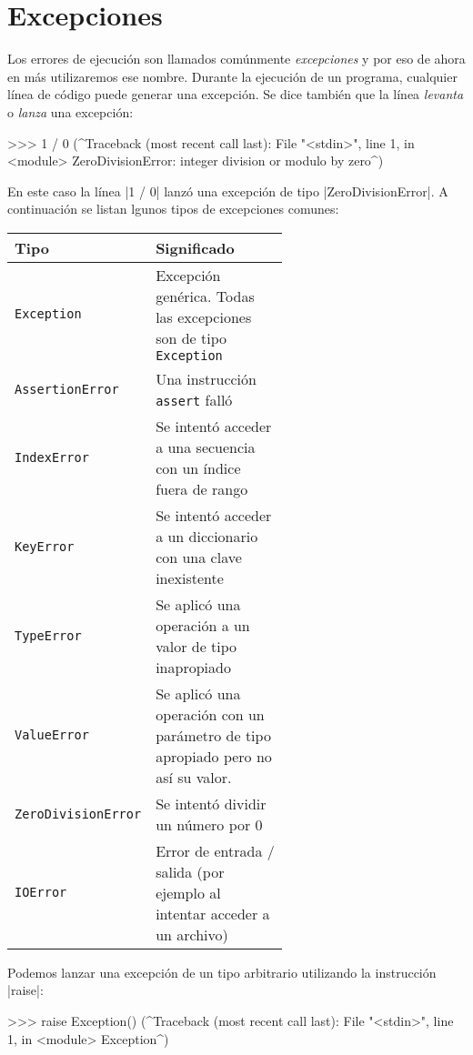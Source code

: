 \section{Excepciones}

Los errores de ejecución son llamados comúnmente \emph{excepciones} y por eso
de ahora en más utilizaremos ese nombre. Durante la ejecución de un programa,
cualquier línea de código puede generar una excepción. Se dice también que la
línea \emph{levanta} o \emph{lanza} una excepción:

\begin{codigo-python-sn}
>>> 1 / 0
(^Traceback (most recent call last):
  File "<stdin>", line 1, in <module>
ZeroDivisionError: integer division or modulo by zero^)
\end{codigo-python-sn}

En este caso la línea |1 / 0| lanzó una excepción de tipo |ZeroDivisionError|.
A continuación se listan lgunos tipos de excepciones comunes:

\begin{center}
\begin{tabular}{l p{0.6\linewidth}}
{\bf Tipo} & {\bf Significado} \\
\hline
\lstinline!Exception! & Excepción genérica. Todas las excepciones son de tipo \lstinline!Exception! \\
\lstinline!AssertionError! & Una instrucción \lstinline!assert!  falló \\
\lstinline!IndexError! & Se intentó acceder a una secuencia con un índice fuera de rango \\
\lstinline!KeyError! & Se intentó acceder a un diccionario con una clave inexistente \\
\lstinline!TypeError! & Se aplicó una operación a un valor de tipo inapropiado \\
\lstinline!ValueError! & Se aplicó una operación con un parámetro de
    tipo apropiado pero no así su valor. \\
\lstinline!ZeroDivisionError! & Se intentó dividir un número por 0 \\
\lstinline!IOError! & Error de entrada / salida (por ejemplo al intentar
    acceder a un archivo) \\
\end{tabular}
\end{center}

Podemos lanzar una excepción de un tipo arbitrario utilizando la instrucción
|raise|:

\begin{codigo-python-sn}
>>> raise Exception()
(^Traceback (most recent call last):
  File "<stdin>", line 1, in <module>
Exception^)
\end{codigo-python-sn}

